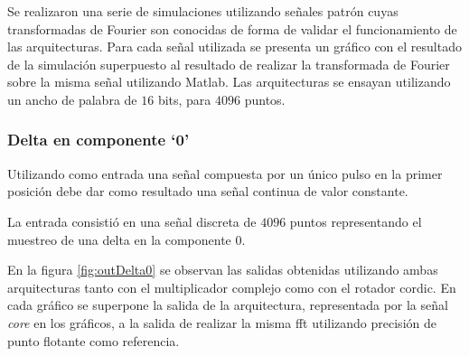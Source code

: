Se realizaron una serie de simulaciones utilizando señales patrón cuyas transformadas de Fourier son
conocidas de forma de validar el funcionamiento de las arquitecturas. Para cada señal utilizada se
presenta un gráfico con el resultado de la simulación superpuesto al resultado de realizar la
transformada de Fourier sobre la misma señal utilizando Matlab.
Las arquitecturas se ensayan utilizando un ancho de palabra de $16$ bits, para $4096$ puntos.

\subsubsection{Delta en componente `0'}

Utilizando como entrada una señal compuesta por un único pulso en la primer posición debe dar como
resultado una señal continua de valor constante.

La entrada consistió en
una señal discreta de $4096$ puntos representando el muestreo de una delta en la componente $0$.

En la figura \ref{fig:outDelta0} se observan las salidas obtenidas utilizando ambas arquitecturas
tanto con el multiplicador complejo como con el rotador cordic. En cada gráfico se superpone la
salida de la arquitectura, representada por la señal \textit{core} en los gráficos, a la salida de
realizar la misma fft utilizando precisión de punto flotante como referencia.

